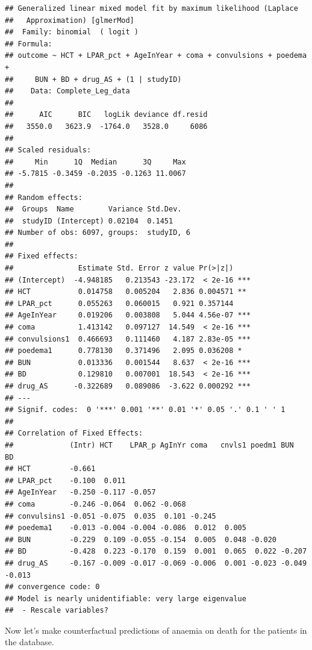 \documentclass[]{article}
\begin{document}
\begin{verbatim}
## Generalized linear mixed model fit by maximum likelihood (Laplace
##   Approximation) [glmerMod]
##  Family: binomial  ( logit )
## Formula: 
## outcome ~ HCT + LPAR_pct + AgeInYear + coma + convulsions + poedema +  
##     BUN + BD + drug_AS + (1 | studyID)
##    Data: Complete_Leg_data
## 
##      AIC      BIC   logLik deviance df.resid 
##   3550.0   3623.9  -1764.0   3528.0     6086 
## 
## Scaled residuals: 
##     Min      1Q  Median      3Q     Max 
## -5.7815 -0.3459 -0.2035 -0.1263 11.0067 
## 
## Random effects:
##  Groups  Name        Variance Std.Dev.
##  studyID (Intercept) 0.02104  0.1451  
## Number of obs: 6097, groups:  studyID, 6
## 
## Fixed effects:
##               Estimate Std. Error z value Pr(>|z|)    
## (Intercept)  -4.948185   0.213543 -23.172  < 2e-16 ***
## HCT           0.014758   0.005204   2.836 0.004571 ** 
## LPAR_pct      0.055263   0.060015   0.921 0.357144    
## AgeInYear     0.019206   0.003808   5.044 4.56e-07 ***
## coma          1.413142   0.097127  14.549  < 2e-16 ***
## convulsions1  0.466693   0.111460   4.187 2.83e-05 ***
## poedema1      0.778130   0.371496   2.095 0.036208 *  
## BUN           0.013336   0.001544   8.637  < 2e-16 ***
## BD            0.129810   0.007001  18.543  < 2e-16 ***
## drug_AS      -0.322689   0.089086  -3.622 0.000292 ***
## ---
## Signif. codes:  0 '***' 0.001 '**' 0.01 '*' 0.05 '.' 0.1 ' ' 1
## 
## Correlation of Fixed Effects:
##             (Intr) HCT    LPAR_p AgInYr coma   cnvls1 poedm1 BUN    BD    
## HCT         -0.661                                                        
## LPAR_pct    -0.100  0.011                                                 
## AgeInYear   -0.250 -0.117 -0.057                                          
## coma        -0.246 -0.064  0.062 -0.068                                   
## convulsins1 -0.051 -0.075  0.035  0.101 -0.245                            
## poedema1    -0.013 -0.004 -0.004 -0.086  0.012  0.005                     
## BUN         -0.229  0.109 -0.055 -0.154  0.005  0.048 -0.020              
## BD          -0.428  0.223 -0.170  0.159  0.001  0.065  0.022 -0.207       
## drug_AS     -0.167 -0.009 -0.017 -0.069 -0.006  0.001 -0.023 -0.049 -0.013
## convergence code: 0
## Model is nearly unidentifiable: very large eigenvalue
##  - Rescale variables?
\end{verbatim}

Now let's make counterfactual predictions of anaemia on death for the
patients in the database.
\end{document}
